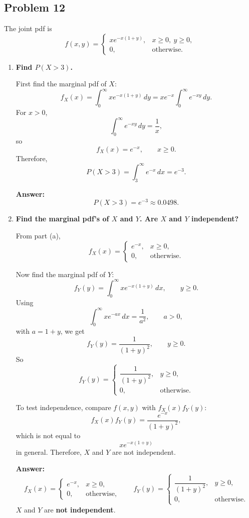 \documentclass[11pt]{article}
\begin{document}
\subsection*{Problem 12}

The joint pdf is
\[
f(x,y)=
\begin{cases}
x e^{-x(1+y)}, & x\ge 0,\ y\ge 0,\\
0, & \text{otherwise}.
\end{cases}
\]

\begin{enumerate}
    \item[(a)] \textbf{Find $P(X>3)$.}

    First find the marginal pdf of $X$:
    \[
    f_X(x)=\int_0^\infty x e^{-x(1+y)}\,dy
    =x e^{-x}\int_0^\infty e^{-xy}\,dy.
    \]
    For $x>0$,
    \[
    \int_0^\infty e^{-xy}\,dy=\frac{1}{x},
    \]
    so
    \[
    f_X(x)=e^{-x}, \qquad x\ge 0.
    \]
    Therefore,
    \[
    P(X>3)=\int_3^\infty e^{-x}\,dx=e^{-3}.
    \]

    \textbf{Answer:}
    \[
    P(X>3)=e^{-3}\approx 0.0498.
    \]

    \item[(b)] \textbf{Find the marginal pdf's of $X$ and $Y$. Are $X$ and $Y$ independent?}

    From part (a),
    \[
    f_X(x)=
    \begin{cases}
    e^{-x}, & x\ge 0,\\
    0, & \text{otherwise}.
    \end{cases}
    \]

    Now find the marginal pdf of $Y$:
    \[
    f_Y(y)=\int_0^\infty x e^{-x(1+y)}\,dx, \qquad y\ge 0.
    \]
    Using
    \[
    \int_0^\infty x e^{-ax}\,dx=\frac{1}{a^2}, \qquad a>0,
    \]
    with $a=1+y$, we get
    \[
    f_Y(y)=\frac{1}{(1+y)^2}, \qquad y\ge 0.
    \]
    So
    \[
    f_Y(y)=
    \begin{cases}
    \dfrac{1}{(1+y)^2}, & y\ge 0,\\
    0, & \text{otherwise}.
    \end{cases}
    \]

    To test independence, compare $f(x,y)$ with $f_X(x)f_Y(y)$:
    \[
    f_X(x)f_Y(y)=\frac{e^{-x}}{(1+y)^2},
    \]
    which is not equal to
    \[
    x e^{-x(1+y)}
    \]
    in general. Therefore, $X$ and $Y$ are not independent.

    \textbf{Answer:}
    \[
    f_X(x)=
    \begin{cases}
    e^{-x}, & x\ge 0,\\
    0, & \text{otherwise},
    \end{cases}
    \qquad
    f_Y(y)=
    \begin{cases}
    \dfrac{1}{(1+y)^2}, & y\ge 0,\\
    0, & \text{otherwise}.
    \end{cases}
    \]
    $X$ and $Y$ are \textbf{not independent}.


\end{enumerate}
\end{document}
